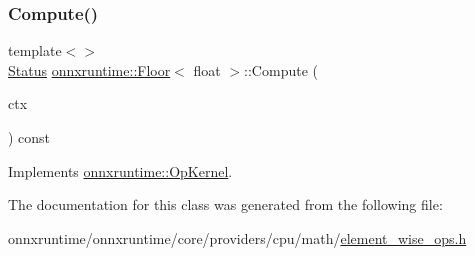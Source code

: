 \subsubsection{\texorpdfstring{Compute()}{Compute()}\hspace{0.1cm}{\footnotesize\ttfamily [2/2]}}
{\footnotesize\ttfamily template$<$$>$ \\
\mbox{\hyperlink{classonnxruntime_1_1common_1_1Status}{Status}} \mbox{\hyperlink{classonnxruntime_1_1Floor}{onnxruntime\+::\+Floor}}$<$ float $>$\+::Compute (\begin{DoxyParamCaption}\item[{\mbox{\hyperlink{classonnxruntime_1_1OpKernelContext}{Op\+Kernel\+Context}} $\ast$}]{ctx }\end{DoxyParamCaption}) const\hspace{0.3cm}{\ttfamily [virtual]}}



Implements \mbox{\hyperlink{classonnxruntime_1_1OpKernel_a9eca8656a78b1b3ab9d3351a12798650}{onnxruntime\+::\+Op\+Kernel}}.



The documentation for this class was generated from the following file\+:\begin{DoxyCompactItemize}
\item 
onnxruntime/onnxruntime/core/providers/cpu/math/\mbox{\hyperlink{element__wise__ops_8h}{element\+\_\+wise\+\_\+ops.\+h}}\end{DoxyCompactItemize}
